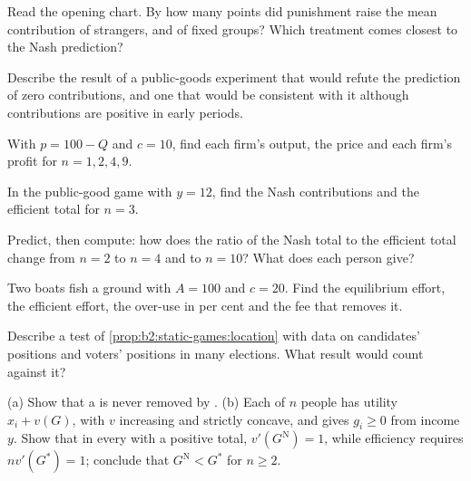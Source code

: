 \begin{exercise}[$\star$]\label{exo:b2:static-games:3}
Read the opening chart. By how many points did punishment raise the mean contribution of strangers, and of fixed
groups? Which treatment comes closest to the Nash prediction?
\end{exercise}

\begin{exercise}[$\star$]\label{exo:b2:static-games:4}
Describe the result of a public-goods experiment that would refute the prediction of zero contributions, and
one that would be consistent with it although contributions are positive in early periods.
\end{exercise}

\begin{exercise}[$\star\star$]\label{exo:b2:static-games:5}
With $p = 100 - Q$ and $c = 10$, find each firm's output, the price and each firm's profit for $n = 1, 2, 4, 9$.
\end{exercise}

\begin{exercise}[$\star\star$]\label{exo:b2:static-games:6}
In the public-good game with $y = 12$, find the Nash contributions and the efficient total for $n = 3$.
\end{exercise}

\begin{exercise}[$\star\star$]\label{exo:b2:static-games:7}
Predict, then compute: how does the ratio of the Nash total to the efficient total change from $n = 2$ to $n = 4$ and
to $n = 10$? What does each person give?
\end{exercise}

\begin{exercise}[$\star\star$]\label{exo:b2:static-games:8}
Two boats fish a ground with $A = 100$ and $c = 20$. Find the equilibrium effort, the efficient effort, the
over-use in per cent and the fee that removes it.
\end{exercise}

\begin{exercise}[$\star\star$]\label{exo:b2:static-games:9}
Describe a test of \cref{prop:b2:static-games:location} with data on candidates' positions and voters'
positions in many elections. What result would count against it?
\end{exercise}

\begin{exercise}[$\star\star\star$]\label{exo:b2:static-games:10}
(a) Show that a  is never removed by .
(b) Each of $n$ people has utility $x_i + v(G)$, with $v$ increasing and strictly concave, and gives $g_i \ge 0$ from
income $y$. Show that in every  with a positive total, $v'(G^{\mathrm{N}}) = 1$, while efficiency requires
$nv'(G^*) = 1$; conclude that $G^{\mathrm{N}} < G^*$ for $n \ge 2$.
\end{exercise}

